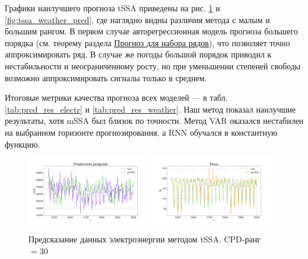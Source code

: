 			Графики наилучшего прогноза tSSA приведены на рис. \ref{fig:tssa_electr_pred} и \ref{fig:tssa_weather_pred}, где наглядно видны различия метода с малым и большим рангом. В первом случае авторегрессионная модель прогноза большего порядка (см. теорему раздела \hyperref[sec:tssa_forecast]{Прогноз для набора рядов}), что позволяет точно аппроксимировать ряд. В случае же погоды большой порядок приводил к нестабильности и неограниченному росту, но при уменьшении степеней свободы возможно аппроксимировать сигналы только в среднем.
			
			Итоговые метрики качества прогноза всех моделей --- в табл. \ref{tab:pred_res_electr} и \ref{tab:pred_res_weather}. Наш метод показал наилучшие результаты, хотя mSSA был близок по точности. Метод VAR оказался нестабилен на выбранном горизонте прогнозирования, а RNN обучался в константную функцию.
			
			\begin{figure}[h]
				\centering
				\includegraphics[width=0.48\textwidth, keepaspectratio]{../experiments/electricity/tssa/figs/prediction/cpd_rank_30/Production_program.png}
				\includegraphics[width=0.48\textwidth, keepaspectratio]{../experiments/electricity/tssa/figs/prediction/cpd_rank_30/Price.png}
				\caption{Предсказание данных электроэнергии методом tSSA. CPD-ранг $ = 30 $}\label{fig:tssa_electr_pred}
			\end{figure}
			
